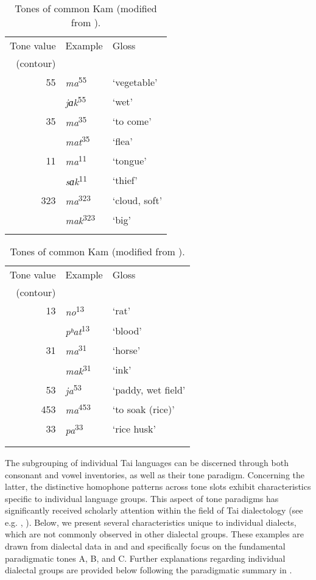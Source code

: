 \documentclass[output=paper]{langscibook}
\begin{document}
\vfill
\begin{table}[H]
\small
\begin{tabular}{rll}
\lsptoprule
  Tone value & Example & Gloss\\
  (contour) & & \\
  \midrule
 55 & \textit{ma}\textsuperscript{55} & ‘vegetable’\\
    & \textit{jɑk}\textsuperscript{55} & ‘wet’\\
 35 & \textit{ma}\textsuperscript{35} & ‘to come’\\
    & \textit{mat}\textsuperscript{35} & ‘flea’\\
 11 & \textit{ma}\textsuperscript{11} & ‘tongue’\\
    & \textit{sɑk}\textsuperscript{11} & ‘thief’\\
323 & \textit{ma}\textsuperscript{323} & ‘cloud, soft’\\
    & \textit{mak}\textsuperscript{323} & ‘big’\\
\lspbottomrule
\end{tabular}
\begin{tabular}{rll}
\lsptoprule
  Tone value & Example & Gloss\\
   (contour) & & \\
  \midrule
 13 & \textit{no}\textsuperscript{13} & ‘rat’\\
    & \textit{pʰat}\textsuperscript{13} & ‘blood’\\
 31 & \textit{ma}\textsuperscript{31} & ‘horse’\\
    & \textit{mak}\textsuperscript{31} & ‘ink’\\
 53 & \textit{ja}\textsuperscript{53} & ‘paddy, wet field’\\
453 & \textit{ma}\textsuperscript{453} & ‘to soak (rice)’\\
 33 & \textit{pa}\textsuperscript{33} & ‘rice husk’\\
 & & \\
\lspbottomrule
\end{tabular}
\caption{Tones of common Kam (modified from \citealt[514]{YangEdmondson2008}).}
\label{tab:yurayong:4}
\end{table}
\vfill\pagebreak


The subgrouping of individual Tai languages can be discerned through both consonant and vowel inventories, as well as their tone paradigm. Concerning the latter, the distinctive homophone patterns across tone slots exhibit characteristics specific to individual language groups. This aspect of tone paradigms has significantly received scholarly attention within the field of Tai dialectology (see e.g. \citealt{Brown1985}, \citealt{Dockum2019}). Below, we present several characteristics unique to individual dialects, which are not commonly observed in other dialectal groups. These examples are drawn from dialectal data in \citet{Brown1985} and \citet{Hartmann2008} and specifically focus on the fundamental paradigmatic tones A, B, and C. Further explanations regarding individual dialectal groups are provided below following the paradigmatic summary in .
\largerpage[-2]
\end{document}
